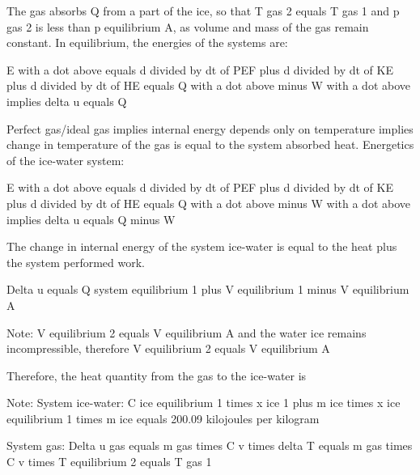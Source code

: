 The gas absorbs Q from a part of the ice, so that T gas 2 equals T gas 1 and p gas 2 is less than p equilibrium A, as volume and mass of the gas remain constant. In equilibrium, the energies of the systems are:

E with a dot above equals d divided by dt of PEF plus d divided by dt of KE plus d divided by dt of HE equals Q with a dot above minus W with a dot above implies delta u equals Q

Perfect gas/ideal gas implies internal energy depends only on temperature implies change in temperature of the gas is equal to the system absorbed heat. Energetics of the ice-water system:

E with a dot above equals d divided by dt of PEF plus d divided by dt of KE plus d divided by dt of HE equals Q with a dot above minus W with a dot above implies delta u equals Q minus W

The change in internal energy of the system ice-water is equal to the heat plus the system performed work.

Delta u equals Q system equilibrium 1 plus V equilibrium 1 minus V equilibrium A

Note:
V equilibrium 2 equals V equilibrium A and the water ice remains incompressible, therefore V equilibrium 2 equals V equilibrium A

Therefore, the heat quantity from the gas to the ice-water is

Note:
System ice-water:
C ice equilibrium 1 times x ice 1 plus m ice times x ice equilibrium 1 times m ice equals 200.09 kilojoules per kilogram

System gas:
Delta u gas equals m gas times C v times delta T equals m gas times C v times T equilibrium 2 equals T gas 1